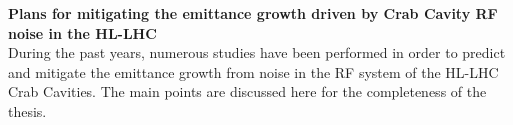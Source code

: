 




\textbf{Plans for mitigating the emittance growth driven by Crab Cavity RF noise in the HL-LHC}\\


During the past years, numerous studies have been performed in order to predict and mitigate the emittance growth from noise in the RF system of the HL-LHC Crab Cavities. The main points are discussed here for the completeness of the thesis.

